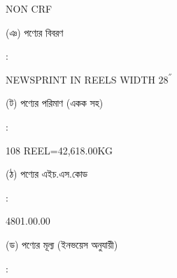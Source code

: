 \documentclass[12pt]{article}
\newcommand{\good}{NEWSPRINT IN REELS WIDTH $28^{''}$}
\newcommand{\pkg}{108 REEL=42,618.00KG}
\newcommand{\crf}{NON CRF}
\newcommand{\crfdt}{}
\newcommand{\hscode}{4801.00.00}
\begin{document}
\begin{minipage}[t]{0.53\linewidth}
{\crf} \hspace{2em} {\crfdt}
\\
\end{minipage}
\begin{minipage}[t]{0.05\linewidth}
\hspace*{1em}
\end{minipage}
\begin{minipage}[t]{0.40\linewidth}
(ঞ) পণ্যের বিবরণ
\end{minipage}
\begin{minipage}[t]{0.02\linewidth}
:
\end{minipage}
\begin{minipage}[t]{0.53\linewidth}
{\good}
\\
\end{minipage}
\begin{minipage}[t]{0.05\linewidth}
\hspace*{1em}
\end{minipage}
\begin{minipage}[t]{0.40\linewidth}
(ট) পণ্যের পরিমাণ (একক সহ)
\end{minipage}
\begin{minipage}[t]{0.02\linewidth}
:
\end{minipage}
\begin{minipage}[t]{0.53\linewidth}
{\pkg}
\\
\end{minipage}
\begin{minipage}[t]{0.05\linewidth}
\hspace*{1em}
\end{minipage}
\begin{minipage}[t]{0.40\linewidth}
(ঠ) পণ্যের এইচ.এস.কোড
\end{minipage}
\begin{minipage}[t]{0.02\linewidth}
:
\end{minipage}
\begin{minipage}[t]{0.53\linewidth}
{\hscode}
\\
\end{minipage}
\begin{minipage}[t]{0.05\linewidth}
\hspace*{1em}
\end{minipage}
\begin{minipage}[t]{0.40\linewidth}
(ড) পণ্যের মূল্য (ইনভয়েস অনুযায়ী)
\end{minipage}
\begin{minipage}[t]{0.02\linewidth}
:
\end{minipage}
\end{document}

